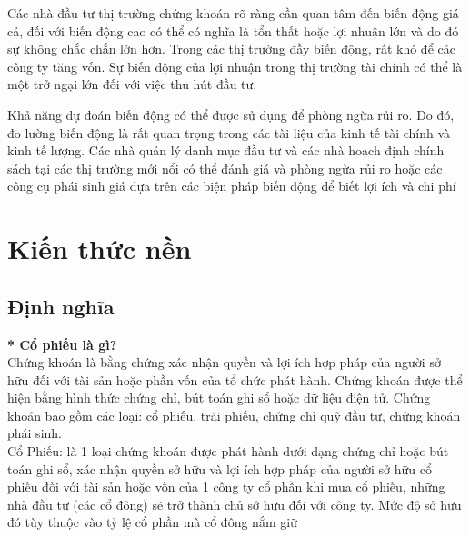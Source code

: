 \documentclass[10pt,a4paper]{article}
\begin{document}
	Các nhà đầu tư thị trường chứng khoán rõ ràng cần quan tâm đến
	biến động giá cả, đối với biến động cao có thể có nghĩa là tổn thất hoặc lợi nhuận lớn và do đó sự không chắc chắn lớn hơn. Trong các thị trường đầy biến động, rất khó để các công ty tăng vốn. Sự biến động của lợi nhuận trong thị trường tài chính có thể là một trở ngại lớn đối với việc thu hút đầu tư.
	
	Khả năng dự đoán biến động có thể được sử dụng để phòng ngừa rủi ro. Do đó, đo lường
	biến động là rất quan trọng trong các tài liệu của kinh tế tài chính và
	kinh tế lượng. Các nhà quản lý danh mục đầu tư và các nhà hoạch định chính sách tại các thị trường mới nổi có thể
	đánh giá và phòng ngừa rủi ro hoặc các công cụ phái sinh giá dựa trên các biện pháp biến động để biết lợi ích và chi phí
	
	\section{Kiến thức nền}
	\subsection{Định nghĩa}
\textbf{* Cổ phiếu là gì?}\\
Chứng khoán là bằng chứng xác nhận quyền và lợi ích hợp pháp của người sở hữu đối với tài sản hoặc phần vốn của tổ chức phát hành. Chứng khoán được thể hiện bằng hình thức chứng chỉ, bút toán ghi sổ hoặc dữ liệu điện tử. Chứng khoán bao gồm các loại: cổ phiếu, trái phiếu, chứng chỉ quỹ đầu tư, chứng khoán phái sinh.\\
Cổ Phiếu: là 1 loại chứng khoán được phát hành dưới dạng chứng chỉ hoặc bút toán ghi sổ, xác nhận quyền sở hữu và lợi ích hợp pháp của người sở hữu cổ phiếu đối với tài sản hoặc vốn của 1 công ty cổ phần khi mua cổ phiếu, những nhà đầu tư (các cổ đông) sẽ trở thành chủ sở hữu đối với công ty. Mức độ sở hữu đó tùy thuộc vào tỷ lệ cổ phần mà cổ đông nắm giữ\\
\end{document}
